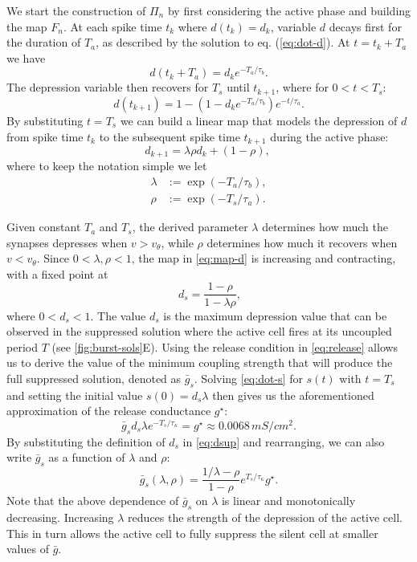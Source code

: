 \documentclass[utf8]{frontiersFPHY} %
\begin{document}
We start the construction of $\Pi_n$ by first considering the active phase and building the map $F_n$.
At each spike time $t_{k}$ where $d(t_k) = d_k$, variable $d$ decays first for the duration of $T_{a}$, as described by the solution to eq. (\ref{eq:dot-d}).  %
At $t = t_k + T_{a}$ we have
\begin{equation}
	d(t_k + T_{a}) = d_k e^{-T_{a}/\tau_b}.
\end{equation}
The depression variable then recovers for $T_{s}$ until $t_{k+1}$, where for $0<t<T_{s}$:
\begin{equation}
	d(t_{k+1}) = 1 - (1 - d_k e^{-T_{a}/\tau_b} )e^{-t/\tau_a}.
\end{equation}
By substituting $t=T_{s}$ we can build a linear map that models the depression of $d$ from spike time $t_{k}$ to the subsequent spike time $t_{k+1}$ during the active phase:
\begin{equation}
	d_{k+1} = \lambda\rho d_{k} + (1-\rho),~\label{eq:map-d}
\end{equation}
where to keep the notation simple we let
\begin{align}
	\lambda & := \exp(-T_{a}/\tau_b), \label{eq:lambda} \\
	\rho    & :=\exp(-T_{s}/\tau_{a}). \label{eq:rho}
\end{align}

Given constant $T_{a}$ and $T_{s}$, the derived parameter $\lambda$ determines how much the synapses depresses when $v>v_{\theta}$, while $\rho$ determines how much it recovers when $v<v_{\theta}$.
Since $0<\lambda, \rho<1$, the map in \cref{eq:map-d} is increasing and contracting, with a fixed point at
\begin{equation}
	~\label{eq:dsup}
	d_{s}=\frac{1-\rho}{1-\lambda\rho},
\end{equation}
where $0<d_{s}<1$.
The value $d_{s}$ is the maximum depression value that can be observed in the suppressed solution where the active cell fires at its uncoupled period $T$ (see \cref{fig:burst-sols}E).
Using the release condition in \cref{eq:release} allows us to derive the value of the minimum coupling strength that will produce the full suppressed solution, denoted as $\bar g_{s}$.
Solving \cref{eq:dot-s} for $s(t)$ with $t=T_{s}$ and setting the initial value $s(0)=d_s\lambda$ then gives us the aforementioned approximation of the release conductance $g^{\star}$:
\begin{equation}
	\label{eq:gstar}
	\bar g_s d_s\lambda e^{-T_{s}/\tau_\kappa}=g^{\star} \approx 0.0068\, \si{mS/cm^2}.
\end{equation}
By substituting the definition of $d_{s}$ in \eqref{eq:dsup} and rearranging, we can also write $\bar g_s$ as a function of $\lambda$ and $\rho$:
\begin{equation}
	\label{eq:gs}
	\bar g_s(\lambda, \rho) = \frac{1/\lambda-\rho}{1-\rho} e^{T_{s}/\tau_\kappa}g^\star.
\end{equation}
Note that the above dependence of $\bar g_{s}$ on $\lambda$ is linear and monotonically decreasing.
Increasing $\lambda$ reduces the strength of the depression of the active cell.
This in turn allows the active cell to fully suppress the silent cell at smaller values of $\bar g$.
\end{document}
